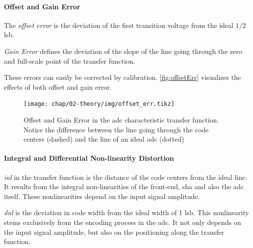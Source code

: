 \paragraph{Offset and Gain Error}
The \textit{offset error} is the deviation of the first transition voltage from the ideal $1/2$ \gls{lsb}.

\textit{Gain Error} defines the deviation of the slope of the line going through the zero and full-scale point of the transfer function. %

These errors can easily be corrected by calibration.
\autoref{fig:offsetErr} visualizes the effects of both offset and gain error. 
\begin{figure}[tbh]
	\centering
	\texttt{[image: chap/02-theory/img/offset\_err.tikz]}
	\caption[Effects of Offset and Fain error in ADC]{Offset and Gain Error in the \gls{adc} characteristic transfer function. Notice the difference between the line going through the code centers (dashed) and the line of an ideal \gls{adc} (dotted)}
	\label{fig:offsetErr}
\end{figure}

\paragraph{Integral and Differential Non-linearity Distortion} 
\textit{\gls{inl}} in the transfer function is the distance of the code centers from the ideal line. %
It results from the integral non-linearities of the front-end, \gls{sha} and also the \gls{adc} itself. \cite{walt} These nonlinearities depend on the input signal amplitude. \cite{Lundberg}

\textit{\gls{dnl}} is the deviation in code width from the ideal width of 1 \gls{lsb}. This nonlinearity stems exclusively from the encoding process in the \gls{adc}. \cite{walt}
It not only depends on the input signal amplitude, but also on the positioning along the transfer function. \cite{Lundberg} %

